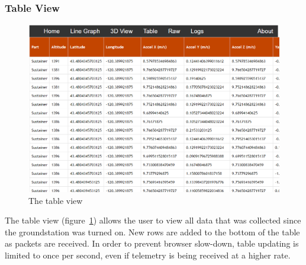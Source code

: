 \documentclass[10pt,draftclsnofoot,onecolumn]{IEEEtran}
\begin{document}
\subsubsection{Table View}
	\begin{figure}[thbp!]
		\centering\includegraphics[width=170mm]{gs-table}
		\caption{The table view}
		\label{gs-table}
	\end{figure}
The table view (figure~\ref{gs-table}) allows the user to view all data that was collected since
the groundstation was turned on.
New rows are added to the bottom of the table as packets are received.
In order to prevent browser slow-down, table updating is limited to once per second,
even if telemetry is being received at a higher rate.
\end{document}
